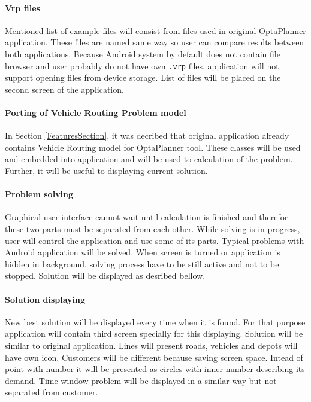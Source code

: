 \paragraph{Vrp files}
Mentioned list of example files will consist from files used in original OptaPlanner application. These files are named
same way so user can compare results between both applications. Because Android system by default does not contain file
browser and user probably do not have own \texttt{.vrp} files, application will not support opening files from device
storage. List of files will be placed on the second screen of the application.

\paragraph{Porting of Vehicle Routing Problem model}
In Section \ref{FeaturesSection}, it was decribed that original application already contains Vehicle Routing model for
OptaPlanner tool. These classes will be used and embedded into application and will be used to calculation of the
problem. Further, it will be useful to displaying current solution.

\paragraph{Problem solving}
Graphical user interface cannot wait until calculation is finished and therefor these two parts must be separated from
each other. While solving is in progress, user will control the application and use some of its parts. Typical problems
with Android application will be solved. When screen is turned or application is hidden in background, solving process
have to be still active and not to be stopped. Solution will be displayed as desribed bellow.

\paragraph{Solution displaying}
New best solution will be displayed every time when it is found. For that purpose application will contain third screen
specially for this displaying. Solution will be similar to original application. Lines will present roads, vehicles and
depots will have own icon. Customers will be different because saving screen space. Intead of point with number it will
be presented as circles with inner number describing its demand. Time window problem will be displayed in a similar way
but not separated from customer.

